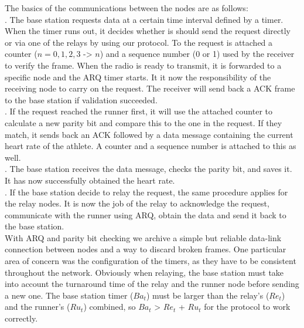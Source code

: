 \noindent The basics of the communications between the nodes are as follows: \\ . The base station requests data at a certain time interval defined by a timer. When the timer runs out, it decides whether is should send the request directly or via one of the relays by using our protocol. To the request is attached a counter ($n = 0, 1, 2, 3$ -> $n$) and a sequence number (0 or 1) used by the receiver to verify the frame. When the radio is ready to transmit, it is forwarded to a specific node and the ARQ timer starts. It it now the responsibility of the receiving node to carry on the request. The receiver will send back a ACK frame to the base station if validation succeeded.\\ . If the request reached the runner first, it will use the attached counter to calculate a new parity bit and compare this to the one in the request. If they match, it sends back an ACK followed by a data message containing the current heart rate of the athlete. A counter and a sequence number is attached to this as well.\\ . The base station receives the data message, checks the parity bit, and saves it. It has now successfully obtained the heart rate.\\ . If the base station decide to relay the request, the same procedure applies for the relay nodes. It is now the job of the relay to acknowledge the request, communicate with the runner using ARQ, obtain the data and send it back to the base station.\\ \newline
\noindent With ARQ and parity bit checking we archive a simple but reliable data-link connection between nodes and a way to discard broken frames. One particular area of concern was the configuration of the timers, as they have to be consistent throughout the network. Obviously when relaying, the base station must take into account the turnaround time of the relay and the runner node before sending a new one. The base station timer ($Ba_t$) must be larger than the relay's ($Re_t$) and the runner's ($Ru_t$) combined, so $Ba_t$ > $Re_t$ + $Ru_t$ for the protocol to work correctly.